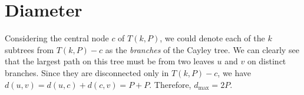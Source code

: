 \section{Diameter}

    Considering the central node $c$ of $T(k,P)$, we could denote each of the $k$ subtrees from $T(k,P) - c$ as the \textit{branches} of the Cayley tree. We can clearly see that the largest path on this tree must be from two leaves $u$ and $v$ on distinct branches. Since they are disconnected only in $T(k,P) - c$, we have $d(u,v) = d(u,c) + d(c,v) = P + P$. Therefore, $d_{\max} = 2 P$.
